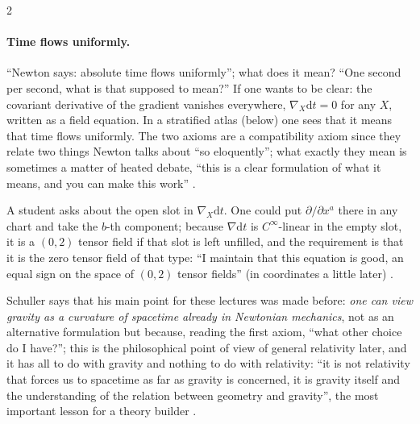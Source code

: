 \begin{paracol}{2}
\paragraph{Time flows uniformly.} ``Newton says: absolute time flows uniformly''; what does it mean? ``One second per second, what is that supposed to mean?'' If one wants to be clear: the covariant derivative of the gradient vanishes everywhere, $\nabla_X\mathrm dt=0$ for any $X$, written as a field equation. In a stratified atlas (below) one sees that it means that time flows uniformly. The two axioms are a compatibility axiom since they relate two things Newton talks about ``so eloquently''; what exactly they mean is sometimes a matter of heated debate, ``this is a clear formulation of what it means, and you can make this work''
.
\begin{coursenote}
A student asks about the open slot in $\nabla_X\mathrm dt$. One could put $\partial/\partial x^a$ there in any chart and take the $b$-th component; because $\nabla\mathrm dt$ is $C^\infty$-linear in the empty slot, it is a $(0,2)$ tensor field if that slot is left unfilled, and the requirement is that it is the zero tensor field of that type: ``I maintain that this equation is good, an equal sign on the space of $(0,2)$ tensor fields'' (in coordinates a little later) .
\end{coursenote}

Schuller says that his main point for these lectures was made before: \emph{one can view gravity as a curvature of spacetime already in Newtonian mechanics}, not as an alternative formulation but because, reading the first axiom, ``what other choice do I have?''; this is the philosophical point of view of general relativity later, and it has all to do with gravity and nothing to do with relativity: ``it is not relativity that forces us to spacetime as far as gravity is concerned, it is gravity itself and the understanding of the relation between geometry and gravity'', the most important lesson for a theory builder
.


\end{paracol}

